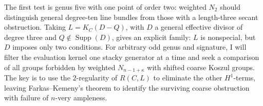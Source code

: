 \documentclass[11pt,reqno]{amsart}
\newtheorem{conjecture}[lemma]{Conjecture}
\theoremstyle{remark}
\newcommand{\Supp}{\operatorname{Supp}}
\newcommand{\BE}{\operatorname{BE}}
\newcommand{\cD}{\mathcal{D}}
\newcommand{\cL}{\mathcal{L}}
\newcommand{\cO}{\mathcal{O}}
\newcommand{\cT}{\mathcal{T}}
\newcommand{\cW}{\mathcal{W}}
\newcommand{\cX}{\mathcal{X}}
\begin{document}
The first test is genus five with one point of order two: weighted $N_2$ should distinguish general degree-ten line bundles from those with a length-three secant obstruction. Taking $L=K_C(D-Q)$, with $D$ a general effective divisor of degree three and $Q\notin\Supp(D)$, gives an explicit family: $L$ is nonspecial, but $D$ imposes only two conditions. For arbitrary odd genus and signature, I will filter the evaluation kernel one stacky generator at a time and seek a comparison of all groups forbidden by weighted $N_{n-1+\kappa}$ with shifted coarse Koszul groups. The key is to use the $2$-regularity of $R(C,L)$ to eliminate the other $H^1$-terms, leaving Farkas--Kemeny's theorem to identify the surviving coarse obstruction with failure of $n$-very ampleness.
%
%
\end{document}
